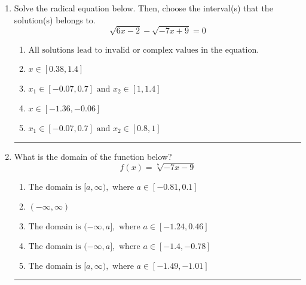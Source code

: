 \documentclass[14pt]{extbook}
\newcommand{\litem}[1]{\item#1\hspace*{-1cm}\rule{\textwidth}{0.4pt}}
\begin{document}
\begin{enumerate}
{\begin{enumerate}[label=\Alph*.]
\end{enumerate} }
\litem{
Solve the radical equation below. Then, choose the interval(s) that the solution(s) belongs to.\[ \sqrt{6 x - 2} - \sqrt{-7 x + 9} = 0 \]\begin{enumerate}[label=\Alph*.]
\item \( \text{All solutions lead to invalid or complex values in the equation.} \)
\item \( x \in [0.38,1.4] \)
\item \( x_1 \in [-0.07, 0.7] \text{ and } x_2 \in [1,1.4] \)
\item \( x \in [-1.36,-0.06] \)
\item \( x_1 \in [-0.07, 0.7] \text{ and } x_2 \in [0.8,1] \)

\end{enumerate} }
\litem{
What is the domain of the function below?\[ f(x) = \sqrt[7]{-7 x - 9} \]\begin{enumerate}[label=\Alph*.]
\item \( \text{The domain is } [a, \infty), \text{   where } a \in [-0.81, 0.1] \)
\item \( (-\infty, \infty) \)
\item \( \text{The domain is } (-\infty, a], \text{   where } a \in [-1.24, 0.46] \)
\item \( \text{The domain is } (-\infty, a], \text{   where } a \in [-1.4, -0.78] \)
\item \( \text{The domain is } [a, \infty), \text{   where } a \in [-1.49, -1.01] \)


\end{enumerate}}
\end{enumerate}
\end{document}
